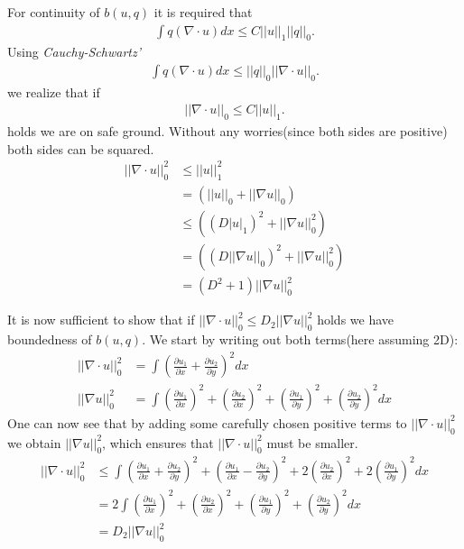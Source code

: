 \documentclass[11pt,a4paper,english]{article}
\numberwithin{equation}{section}
\begin{document}
For continuity of $b(u,q)$ it is required that
\begin{align*}
\int q(\nabla \cdot u) dx \leq C ||u||_1 ||q||_0.
\end{align*}
Using \emph{Cauchy-Schwartz'} 
\begin{align*}
\int q(\nabla \cdot u) dx \leq ||q||_0 ||\nabla \cdot u ||_0. 
\end{align*}
we realize that if  
\begin{align*}
||\nabla \cdot u||_0 \leq  C ||u||_1.
\end{align*}
holds we are on safe ground. Without any worries(since both sides are positive) both sides can be squared. 
\begin{align*}
||\nabla \cdot u||_0^2 &\leq  ||u||_1^2 \\
&=  \left( ||u||_0 + ||\nabla u ||_0  \right) \\
&\leq \left( (D|u|_1)^2 + ||\nabla u||_0^2  \right) \\
&=  \left( (D||\nabla u||_0)^2 + ||\nabla u||_0^2  \right) \\
&= (D^2+1)||\nabla u||_0^2
\end{align*}

It is now sufficient to show that if $||\nabla \cdot u||_0^2 \leq D_2|| \nabla u||_0^2$ holds we have boundedness of $b(u,q)$. We start by writing out both terms(here assuming 2D): 
\begin{align*}
||\nabla \cdot u||_0^2 &= \int \left( \frac{\partial u_1}{\partial x} + \frac{\partial u_2}{\partial y}\right)^2 dx \\ 
|| \nabla u||_0^2 &= \int \left( \frac{\partial u_1}{\partial x} \right)^2 + \left( \frac{\partial u_2}{\partial x} \right)^2 + \left( \frac{\partial u_1}{\partial y} \right)^2 + \left( \frac{\partial u_2}{\partial y} \right)^2 dx
\end{align*}
One can now see that by adding some carefully chosen positive terms to $||\nabla \cdot u||_0^2$ we obtain 
$|| \nabla u||_0^2$, which ensures that $||\nabla \cdot u||_0^2$ must be smaller.
\begin{align*}
||\nabla \cdot u||_0^2 &\leq \int \left( \frac{\partial u_1}{\partial x} + \frac{\partial u_2}{\partial y} \right)^2 + \left( \frac{\partial u_1}{\partial x} - \frac{\partial u_2}{\partial y} \right)^2 + 2\left( \frac{\partial u_2}{\partial x} \right)^2 + 2\left( \frac{\partial u_1}{\partial y} \right)^2  dx \\ 
&= 2 \int \left( \frac{\partial u_1}{\partial x} \right)^2 + \left( \frac{\partial u_2}{\partial x} \right)^2 + \left( \frac{\partial u_1}{\partial y} \right)^2 + \left( \frac{\partial u_2}{\partial y} \right)^2 dx \\
&= D_ 2 || \nabla u||_0^2
\end{align*}
\end{document}

